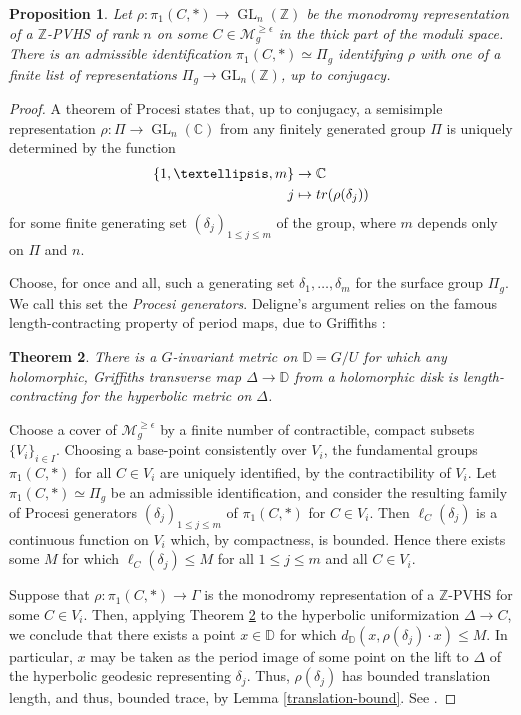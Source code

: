 \documentclass[10pt,letterpaper,english,reqno]{amsart}
\numberwithin{equation}{subsection}
\newcommand\cM{{\mathcal M}}
\newcommand\C{{\mathbb C}}
\newcommand\bD{{\mathbb D}}
\newcommand\Z{{\mathbb Z}}
\DeclareMathOperator{\GL}{GL}
\newtheorem{theorem}{Theorem}[section]
\newtheorem{proposition}[theorem]{Proposition}
\theoremstyle{definition}
\begin{document}
\begin{proposition}\label{deligne-thick} Let 
$\rho\colon \pi_1(C,*)\to \GL_n(\Z)$ be the 
monodromy representation of a $\Z$-PVHS of rank $n$
on some $C\in \cM_g^{\geq \epsilon}$ in the thick part of
the moduli space. There is an admissible identification $\pi_1(C,*)\simeq \Pi_g$ identifying $\rho$ with
one of a finite list of representations $\Pi_g\to \mathrm{GL}_n(\Z)$, up to conjugacy. \end{proposition}

\begin{proof}
A theorem of Procesi \cite{procesi}
states that, up to conjugacy, a semisimple representation
$\rho\colon \Pi\to \GL_n(\C)$
from any finitely generated group $\Pi$
is uniquely determined by the function
\begin{align*} \{1,\dots,m\}&\to \C \\ 
j&\mapsto {\rm tr}(\rho(\delta_j))
\end{align*}
for some finite generating set 
$(\delta_j)_{1\leq j\leq m}$
of the group, where $m$ depends only on $\Pi$ 
and $n$. 

Choose, for once and all, such a generating
set $\delta_1,\dots,\delta_m$ for the surface group
$\Pi_g$. We call this set the
{\it Procesi generators}.
Deligne's argument relies on the famous length-contracting property of period maps,
due to Griffiths \cite[10.1]{griffithsIII}:

\begin{theorem}\label{length-contracting} There is a $G$-invariant metric on $\bD=G/U$ for which any holomorphic, 
Griffiths transverse map $\Delta\to \bD$ from a holomorphic disk 
is length-contracting for the hyperbolic metric on $\Delta$.
\end{theorem}

Choose a cover of $\cM_g^{\geq \epsilon}$ by a finite number
of contractible, compact subsets $\{V_i\}_{i\in I}$.
Choosing a base-point consistently over $V_i$,
the fundamental groups $\pi_1(C,*)$
for all $C\in V_i$ are uniquely identified, by the
contractibility of $V_i$. Let $\pi_1(C,*)\simeq \Pi_g$
be an admissible identification, and consider
the resulting family of Procesi generators $(\delta_j)_{1\leq j\leq m}$
of $\pi_1(C,*)$ for $C\in V_i$. Then $\ell_C(\delta_j)$
is a continuous function on $V_i$ which, by compactness,
is bounded. Hence there exists some $M$ for which
$\ell_C(\delta_j)\leq M$ for all $1\leq j\leq m$ and all $C\in V_i$.

Suppose that $\rho\colon \pi_1(C,*)\to \Gamma$ is the monodromy
representation of a $\Z$-PVHS for some $C\in V_i$.
Then, applying Theorem \ref{length-contracting} to the
hyperbolic uniformization $\Delta\to C$,
we conclude that there exists a point $x\in \bD$
for which $d_{\bD}(x,\rho(\delta_j)\cdot x)\leq M$. In particular,
$x$ may be taken as the period image of some
point on the lift to $\Delta$ of the hyperbolic geodesic representing $\delta_j$.
Thus, $\rho(\delta_j)$ has bounded translation length,
and thus, bounded trace, by Lemma
\ref{translation-bound}. See \cite[Corollaire 1.9]{deligne87}.


\end{proof}
\end{document}

